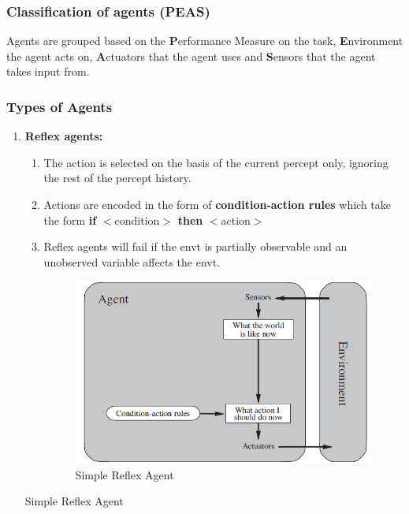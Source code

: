 \documentclass{article}
\theoremstyle{plain}
\theoremstyle{definition}
\begin{document}
    \subsubsection{Classification of agents (PEAS)}
    
    Agents are grouped based on the \textbf{P}erformance Measure on the task, \textbf{E}nvironment the agent acts on, \textbf{A}ctuators that the agent uses and \textbf{S}ensors that the agent takes input from.
    
    \subsubsection{Types of Agents}
    
    \begin{enumerate}
        \item \textbf{Reflex agents:}
        \begin{enumerate}
            \item The action is selected on the basis of the current percept only, ignoring the rest of the percept history. 
            
            \item Actions are encoded in the form of \textbf{condition-action rules} which take the form \textbf{if} $<$condition$>$ \textbf{then} $<$action$>$
            
            \item Reflex agents will fail if the envt is partially observable and an unobserved variable affects the envt.
            
            \break
            \begin{figure}[ht]
            \centering
            \includegraphics[scale=0.6]{ml1.png}
            \caption{Simple Reflex Agent}
            \label{fig:my_label}
        \end{figure}
        \end{enumerate}
        \begin{algorithm}[h]
            \caption{Simple Reflex Agent}
            \begin{algorithmic}[1]
            

\end{algorithmic}
\end{algorithm}
\end{enumerate}
\end{document}
